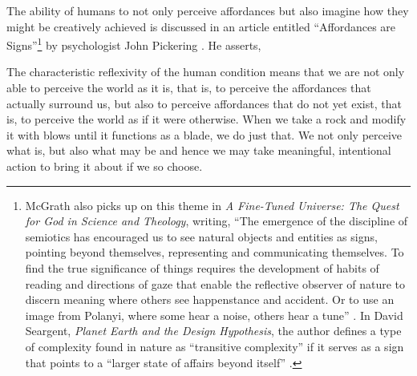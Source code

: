 The ability of humans to not only perceive affordances but also imagine
how they might be creatively achieved is discussed in an article
entitled ``Affordances are Signs''\footnote{%
McGrath also picks up on this
theme in \textit{A Fine-Tuned Universe: The Quest
for God in Science and Theology}, writing, ``The emergence of the discipline of semiotics
has encouraged us to see natural objects and entities as signs,
pointing beyond themselves, representing and communicating themselves.
To find the true significance of things requires the development of
habits of reading and directions of gaze that enable the reflective
observer of nature to discern meaning where others see happenstance and
accident. Or to use an image from Polanyi, where some hear a noise,
others hear a tune” \citep[][p.~3]{mcgrath2009}. In David Seargent, \textit{Planet Earth and the
Design Hypothesis}, the author defines a
type of complexity found in nature as “transitive complexity” if it
serves as a sign that points to a “larger state of affairs beyond
itself” \citep{seargent2007}.
} by psychologist
John Pickering \citep{pickering2007}. He asserts, 

\begin{quoting}
The characteristic reflexivity of the
human condition means that we are not only able to perceive the world
as it is, that is, to perceive the affordances that actually surround
us, but also to perceive affordances that do not yet exist, that is, to
perceive the world as if it were otherwise. When we take a rock and
modify it with blows until it functions as a blade, we do just that. We
not only perceive what is, but also what may be and hence we may take
meaningful, intentional action to bring it about if we so choose. \citep{pickering2007}
\end{quoting}

